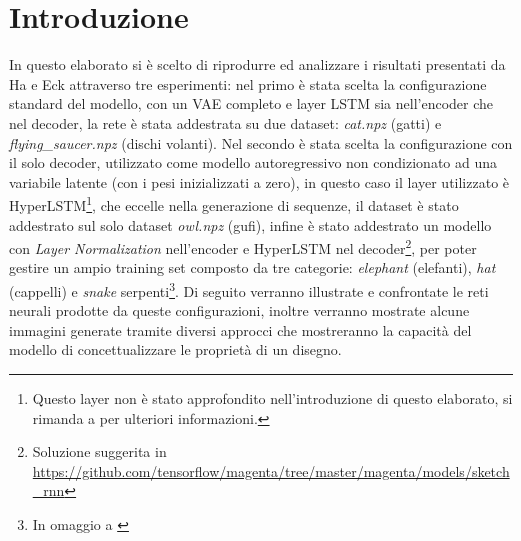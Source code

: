 \section{Introduzione} %
\label{sec:introduzione}
In questo elaborato si è scelto di riprodurre ed analizzare i risultati presentati da Ha e Eck attraverso tre esperimenti: nel primo è stata scelta la configurazione standard del modello, con un VAE completo e layer LSTM sia nell'encoder che nel decoder, la rete è stata addestrata su due dataset: \textit{cat.npz} (gatti) e \textit{flying\_saucer.npz} (dischi volanti). Nel secondo è stata scelta la configurazione con il solo decoder, utilizzato come modello autoregressivo non condizionato ad una variabile latente (con i pesi inizializzati a zero), in questo caso il layer utilizzato è HyperLSTM\footnote{Questo layer non è stato approfondito nell'introduzione di questo elaborato, si rimanda a \cite{hyperlstm} per ulteriori informazioni.}, che eccelle nella generazione di sequenze, il dataset è stato addestrato sul solo dataset \textit{owl.npz} (gufi), infine è stato addestrato un modello con \textit{Layer Normalization} nell'encoder e HyperLSTM nel decoder\footnote{Soluzione suggerita in \url{https://github.com/tensorflow/magenta/tree/master/magenta/models/sketch_rnn}}, per poter gestire un ampio training set composto da tre categorie: \textit{elephant} (elefanti), \textit{hat} (cappelli) e \textit{snake} serpenti\footnote{In omaggio a \cite{petitprince}}. Di seguito verranno illustrate e confrontate le reti neurali prodotte da queste configurazioni, inoltre verranno mostrate alcune immagini generate tramite diversi approcci che mostreranno la capacità del modello di concettualizzare le proprietà di un disegno.

